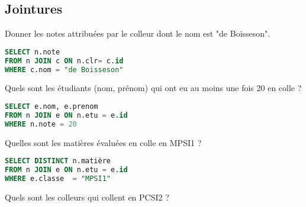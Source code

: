 \subsection{Jointures} 
\begin{Exercise}
Donner les notes attribuées par le colleur dont le nom est "de Boisseson".
\end{Exercise}
\begin{Answer}
\begin{lstlisting}[language=SQL]
SELECT n.note
FROM n JOIN c ON n.clr= c.id
WHERE c.nom = "de Boisseson"
\end{lstlisting}
\end{Answer}
\begin{Exercise}
Quels sont les étudiants (nom, prénom) qui ont eu au moins une fois 20 en colle ?
\end{Exercise}
\begin{Answer}
\begin{lstlisting}[language=SQL]
SELECT e.nom, e.prenom
FROM n JOIN e ON n.etu = e.id
WHERE n.note = 20
\end{lstlisting}
\end{Answer}
\begin{Exercise}
Quelles sont les matières évaluées en colle en MPSI1 ?
\end{Exercise}
\begin{Answer}
\begin{lstlisting}[language=SQL]
SELECT DISTINCT n.matière
FROM n JOIN e ON n.etu = e.id
WHERE e.classe  = "MPSI1"
\end{lstlisting}
\end{Answer}
\begin{Exercise}
Quels sont les colleurs qui collent en PCSI2 ?
\end{Exercise}
